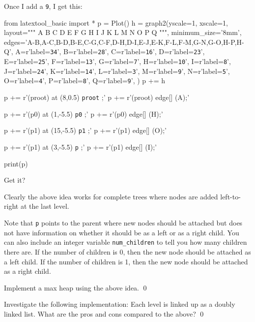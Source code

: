 Once I add a \texttt{9}, I get this:


\begin{python}
from latextool_basic import *
p = Plot()
h = graph2(yscale=1, xscale=1,
layout="""
        A 
    B       C 
  D   E   F   G
 H I J K L M N O
P Q
""",
minimum_size='8mm',
edges='A-B,A-C,B-D,B-E,C-G,C-F,D-H,D-I,E-J,E-K,F-L,F-M,G-N,G-O,H-P,H-Q',
A=r'label=\texttt{34}',
B=r'label=\texttt{28}',
C=r'label=\texttt{16}',
D=r'label=\texttt{23}',
E=r'label=\texttt{25}',
F=r'label=\texttt{13}',
G=r'label=\texttt{7}',
H=r'label=\texttt{10}',
I=r'label=\texttt{8}',
J=r'label=\texttt{24}',
K=r'label=\texttt{14}',
L=r'label=\texttt{3}',
M=r'label=\texttt{9}',
N=r'label=\texttt{5}',
O=r'label=\texttt{4}',
P=r'label=\texttt{8}',
Q=r'label=\texttt{9}',
)
p += h

p += r'\node (proot) at (8,0.5) {\texttt{proot}} ;'
p += r'\path [-triangle 60] (proot) edge[] (A);'

p += r'\node (p0) at (1,-5.5) {\texttt{p0}} ;'
p += r'\path [-triangle 60] (p0) edge[] (H);'

p += r'\node (p1) at (15,-5.5) {\texttt{p1}} ;'
p += r'\path [-triangle 60] (p1) edge[] (O);'


p += r'\node (p1) at (3,-5.5) {\texttt{p}} ;'
p += r'\path [-triangle 60] (p1) edge[] (I);'

print(p)
\end{python}

Get it?

  
Clearly the above idea works for complete trees where
nodes are added left-to-right at the last level.

Note that \verb!p! points to the parent where new nodes should be
attached but does not have information on whether it should be
as a left or as a right child.
You can also include an integer variable \texttt{num\_children}
to tell you how many children
there are.
If the number of children is 0, then the new node should be
attached as a left child.
If the number of children is 1, then the new node should be attached
as a right child.

\begin{ex}
  Implement a max heap using the above idea.
  \qed
\end{ex}


\begin{ex}
  Investigate the following implementation:
 Each level is linked up as a doubly linked list.
 What are the pros and cons compared to the above?
 \qed
\end{ex}
